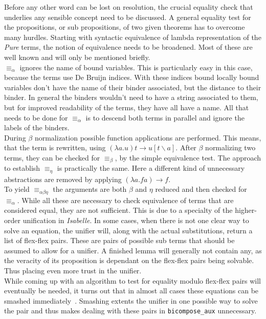 Before any other word can be lost on resolution, the crucial equality check that underlies any sensible concept need to be discussed. A general equality test for the propositions, or sub propositions, of two given theorems has to overcome many hurdles. Starting with syntactic equivalence of lambda representation of the \textit{Pure} terms, the notion of equivalence needs to be broadened. Most of these are well known and will only be mentioned briefly.\\
$\equiv_\alpha$ ignores the name of bound variables. This is particularly easy in this case, because the terms use De Bruijn indices. With these indices bound locally bound variables don't have the name of their binder associated, but the distance to their binder. In general the binders wouldn't need to have a string associated to them, but for improved readability of the terms, they have all have a name. All that needs to be done for $\equiv_\alpha$ is to descend both terms in parallel and ignore the labels of the binders.\\
During $\beta$ normalization possible function applications are performed. This means, that the term is rewritten, using $(\lambda a.u) t \rightarrow u[t \backslash a]$. After $\beta$ normalizing two terms, they can be checked for $\equiv_\beta$, by the simple equivalence test. The approach to establish $\equiv_\eta$ is practically the same. Here a different kind of unnecessary abstractions are removed by applying $(\lambda a.f a) \rightarrow f$.\\
To yield $\equiv_{\alpha\beta\eta}$ the arguments are both $\beta$ and $\eta$ reduced and then checked for $\equiv_\alpha$. While all these are necessary to check equivalence of terms that are considered equal, they are not sufficient. This is due to a specialty of the higher-order unification in \textit{Isabelle}. In some cases, when there is not one clear way to solve an equation, the unifier will, along with the actual substitutions, return a list of flex-flex pairs. These are pairs of possible sub terms that should be assumed to allow for a unifier. A finished lemma will generally not contain any, as the veracity of its proposition is dependant on the flex-flex pairs being solvable. Thus placing even more trust in the unifier.\\
While coming up with an algorithm to test for equality modulo flex-flex pairs will eventually be needed, it turns out that in almost all cases these equations can be smashed immediately~\parencite{Wimmer2016}. Smashing extents the unifier in one possible way to solve the pair and thus makes dealing with these pairs in \texttt{bicompose\_aux} unnecessary.

